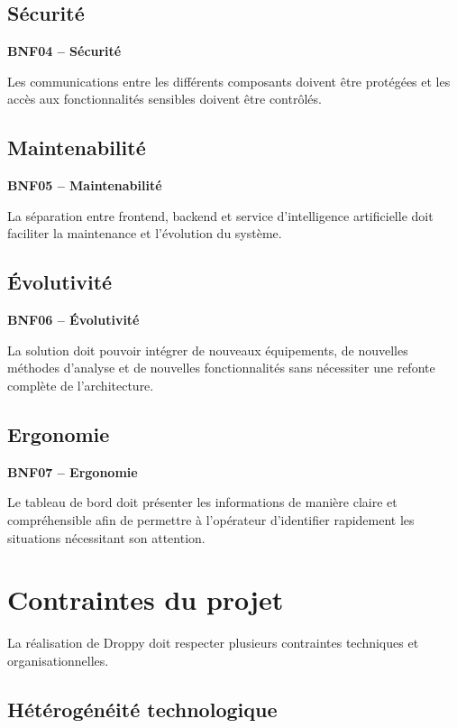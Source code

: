\subsection{Sécurité}

\textbf{BNF04 -- Sécurité}

Les communications entre les différents composants doivent être protégées
et les accès aux fonctionnalités sensibles doivent être contrôlés.

\subsection{Maintenabilité}

\textbf{BNF05 -- Maintenabilité}

La séparation entre frontend, backend et service d'intelligence artificielle
doit faciliter la maintenance et l'évolution du système.

\subsection{Évolutivité}

\textbf{BNF06 -- Évolutivité}

La solution doit pouvoir intégrer de nouveaux équipements, de nouvelles
méthodes d'analyse et de nouvelles fonctionnalités sans nécessiter une
refonte complète de l'architecture.

\subsection{Ergonomie}

\textbf{BNF07 -- Ergonomie}

Le tableau de bord doit présenter les informations de manière claire et
compréhensible afin de permettre à l'opérateur d'identifier rapidement
les situations nécessitant son attention.


\section{Contraintes du projet}

La réalisation de Droppy doit respecter plusieurs contraintes techniques
et organisationnelles.

\subsection{Hétérogénéité technologique}

